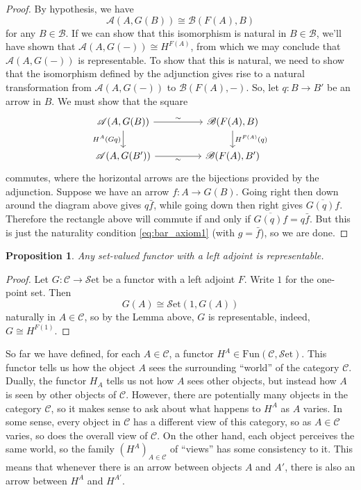 \documentclass[10pt,oneside]{book}
\def\~#1{\mathscr{#1}}
\newcommand{\Fun}{\mathrm{Fun}}
\newcommand{\Set}{\~S\mathrm{et}}
\theoremstyle{plain}
\newtheorem{prop}[thm]{Proposition}
\theoremstyle{definition}
\theoremstyle{remark}
\numberwithin{equation}{section}
\numberwithin{figure}{section}
\begin{document}
\begin{proof}
    By hypothesis, we have
    \[\~A(A, G(B)) \cong \~B(F(A), B)\]
    for any $B \in \~B$. If we can show that this isomorphism is natural in $B \in \~B$, we'll have shown that $\~A(A, G(-)) \cong H^{F(A)}$, from which we may conclude that $\~A(A, G(-))$ is representable. To show that this is natural, we need to show that the isomorphism defined by the adjunction gives rise to a natural transformation from $\~A(A, G(-))$ to $\~B(F(A), -)$. So, let $q: B \to B'$ be an arrow in $B$. We must show that the square 
    \[\begin{tikzcd}
        {\~A(A, G(B))} && {\~B(F(A), B)} \\
        {\~A(A, G(B'))} && {\~B(F(A), B')}
        \arrow["\sim", from=1-1, to=1-3]
        \arrow["{H^A(Gq)}"', from=1-1, to=2-1]
        \arrow["{H^{F(A)}(q)}", from=1-3, to=2-3]
        \arrow["\sim"', from=2-1, to=2-3]
    \end{tikzcd}\]
    commutes, where the horizontal arrows are the bijections provided by the adjunction. Suppose we have an arrow $f: A \to G(B)$. Going right then down around the diagram above gives $q\bar{f}$, while going down then right gives $\overline{G(q)f}$. Therefore the rectangle above will commute if and only if $\overline{G(q)f} = q\bar{f}$. But this is just the naturality condition \ref{eq:bar_axiom1} (with $g = \bar{f}$), so we are done.
\end{proof}

\begin{prop}
    Any set-valued functor with a left adjoint is representable.
\end{prop}

\begin{proof}
    Let $G: \~C \to \Set$ be a functor with a left adjoint $F$. Write $1$ for the one-point set. Then 
    \[G(A) \cong \Set(1, G(A))\]
    naturally in $A \in \~C$, so by the Lemma above, $G$ is representable, indeed, $G \cong H^{F(1)}$.
\end{proof}

So far we have defined, for each $A \in \~C$, a functor $H^A \in \Fun(\~C, \Set)$. This functor tells us how the object $A$ sees the surrounding ``world'' of the category $\~C$.  Dually, the functor $H_A$ tells us not how $A$ sees other objects, but instead how $A$ is seen by other objects of $\~C$. However, there are potentially many objects in the category $\~C$, so it makes sense to ask about what happens to $H^A$ as $A$ varies. In some sense, every object in $\~C$ has a different view of this category, so as $A \in \~C$ varies, so does the overall view of $\~C$.  On the other hand, each object perceives the same world, so the family $(H^A)_{A \in \~C}$ of ``views'' has some consistency to it. This means that whenever there is an arrow between objects $A$ and $A'$, there is also an arrow between $H^A$ and $H^{A'}$.
\end{document}
